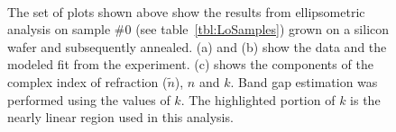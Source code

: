 \begin{figure}[htbp]
   \centering
   \hspace{0.5cm}
   \\
   \caption[Results of Ellipsometry on Sample \#0]%
   		{The set of plots shown above show the results from ellipsometric analysis on sample \#0 (see %
		table~\vref{tbl:LoSamples}) grown on a silicon wafer and subsequently annealed. (a) and (b) %
		show the data and the modeled fit from the experiment. (c) shows the components of the complex %
		index of refraction ($\tilde n$), $n$ and $k$. Band gap estimation was performed using the values %
		of $k$. The highlighted portion of $k$ is the nearly linear region used in this analysis.}
   \label{fig:Ellip-0-SiO2}
\end{figure}


